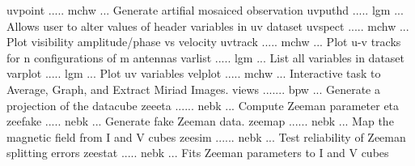 {\eightpoint\begintt
uvpoint ..... mchw ... Generate artifial mosaiced observation 
uvputhd ..... lgm  ... Allows user to alter values of header variables in uv dataset
uvspect ..... mchw ... Plot visibility amplitude/phase vs velocity 
uvtrack ..... mchw ... Plot u-v tracks for n configurations of m antennas 
varlist ..... lgm  ... List all variables in dataset 
\endtt}
{\eightpoint\begintt
varplot ..... lgm  ... Plot uv variables 
velplot ..... mchw ... Interactive task to Average, Graph, and Extract Miriad Images. 
views ....... bpw  ... Generate a projection of the datacube 
zeeeta ...... nebk ... Compute Zeeman parameter eta 
zeefake ..... nebk ... Generate fake Zeeman data. 
\endtt}
{\eightpoint\begintt
zeemap ...... nebk ... Map the magnetic field from I and V cubes 
zeesim ...... nebk ... Test reliability of Zeeman splitting errors 
zeestat ..... nebk ... Fits Zeeman parameters to I and V cubes 
\endtt}
